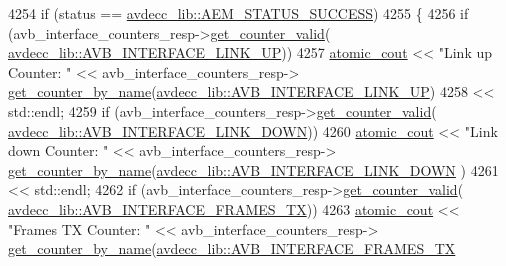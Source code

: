 \begin{DoxyCode}
4254             \textcolor{keywordflow}{if} (status == \hyperlink{namespaceavdecc__lib_affd436edb2cecd20cfd784a84f852b2bac947077909cb590b84f4b5db413080e0}{avdecc\_lib::AEM\_STATUS\_SUCCESS})
4255             \{
4256                 \textcolor{keywordflow}{if} (avb\_interface\_counters\_resp->\hyperlink{classavdecc__lib_1_1avb__counters__response_a1a714d004a3ca8b521311ba4d3e62e93}{get\_counter\_valid}(
      \hyperlink{namespaceavdecc__lib_a831be56dba8ac423258a9374a1202df4ace6e5d91922a5894bb43065219ae3e5d}{avdecc\_lib::AVB\_INTERFACE\_LINK\_UP}))
4257                     \hyperlink{cmd__line_8h_a0bc38ccc65c79ba06c6fcd7b4bf554c3}{atomic\_cout} << \textcolor{stringliteral}{"Link up Counter: "} << avb\_interface\_counters\_resp->
      \hyperlink{classavdecc__lib_1_1avb__counters__response_aad68050f63fc17c24527b3157d6ca8c7}{get\_counter\_by\_name}(\hyperlink{namespaceavdecc__lib_a831be56dba8ac423258a9374a1202df4ace6e5d91922a5894bb43065219ae3e5d}{avdecc\_lib::AVB\_INTERFACE\_LINK\_UP})
4258                                 << std::endl;
4259                 \textcolor{keywordflow}{if} (avb\_interface\_counters\_resp->\hyperlink{classavdecc__lib_1_1avb__counters__response_a1a714d004a3ca8b521311ba4d3e62e93}{get\_counter\_valid}(
      \hyperlink{namespaceavdecc__lib_a831be56dba8ac423258a9374a1202df4aa789342277252d530b88a3d6f0330ba1}{avdecc\_lib::AVB\_INTERFACE\_LINK\_DOWN}))
4260                     \hyperlink{cmd__line_8h_a0bc38ccc65c79ba06c6fcd7b4bf554c3}{atomic\_cout} << \textcolor{stringliteral}{"Link down Counter: "} << avb\_interface\_counters\_resp->
      \hyperlink{classavdecc__lib_1_1avb__counters__response_aad68050f63fc17c24527b3157d6ca8c7}{get\_counter\_by\_name}(\hyperlink{namespaceavdecc__lib_a831be56dba8ac423258a9374a1202df4aa789342277252d530b88a3d6f0330ba1}{avdecc\_lib::AVB\_INTERFACE\_LINK\_DOWN}
      )
4261                                 << std::endl;
4262                 \textcolor{keywordflow}{if} (avb\_interface\_counters\_resp->\hyperlink{classavdecc__lib_1_1avb__counters__response_a1a714d004a3ca8b521311ba4d3e62e93}{get\_counter\_valid}(
      \hyperlink{namespaceavdecc__lib_a831be56dba8ac423258a9374a1202df4a1952a099e63d03a7dcb1d6e3b0ea50af}{avdecc\_lib::AVB\_INTERFACE\_FRAMES\_TX}))
4263                     \hyperlink{cmd__line_8h_a0bc38ccc65c79ba06c6fcd7b4bf554c3}{atomic\_cout} << \textcolor{stringliteral}{"Frames TX Counter: "} << avb\_interface\_counters\_resp->
      \hyperlink{classavdecc__lib_1_1avb__counters__response_aad68050f63fc17c24527b3157d6ca8c7}{get\_counter\_by\_name}(\hyperlink{namespaceavdecc__lib_a831be56dba8ac423258a9374a1202df4a1952a099e63d03a7dcb1d6e3b0ea50af}{avdecc\_lib::AVB\_INTERFACE\_FRAMES\_TX}

\end{DoxyCode}
